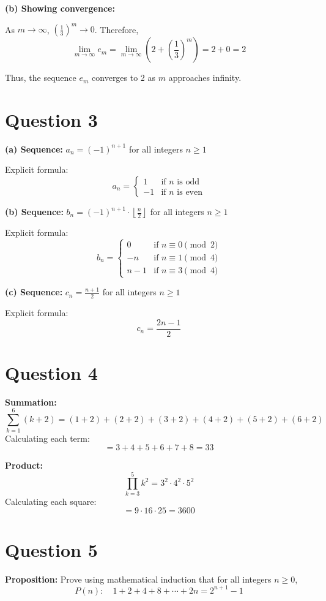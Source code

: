 \documentclass{article}
\begin{document}
\textbf{(b) Showing convergence:}

As $m \to \infty$, $\left(\frac{1}{3}\right)^m \to 0$. Therefore,
\[
\lim_{m \to \infty} e_m = \lim_{m \to \infty} \left(2 + \left(\frac{1}{3}\right)^m\right) = 2 + 0 = 2
\]

Thus, the sequence $e_m$ converges to 2 as $m$ approaches infinity.

\section*{Question 3}

\textbf{(a) Sequence: } $a_n = (-1)^{n+1}$ for all integers $n \geq 1$

Explicit formula:
\[
a_n = \begin{cases}
1 & \text{if } n \text{ is odd} \\
-1 & \text{if } n \text{ is even}
\end{cases}
\]

\textbf{(b) Sequence: } $b_n = (-1)^{n+1} \cdot \left\lfloor \frac{n}{2} \right\rfloor$ for all integers $n \geq 1$

Explicit formula:
\[
b_n = \begin{cases}
0 & \text{if } n \equiv 0 \pmod{2} \\
-n & \text{if } n \equiv 1 \pmod{4} \\
n-1 & \text{if } n \equiv 3 \pmod{4}
\end{cases}
\]

\textbf{(c) Sequence: } $c_n = \frac{n+1}{2}$ for all integers $n \geq 1$

Explicit formula:
\[
c_n = \frac{2n - 1}{2}
\]

\section*{Question 4}

\textbf{Summation: }
\[
\sum_{k=1}^{6} (k+2) = (1+2) + (2+2) + (3+2) + (4+2) + (5+2) + (6+2)
\]
Calculating each term:
\[
= 3 + 4 + 5 + 6 + 7 + 8 = 33
\]

\textbf{Product: }
\[
\prod_{k=3}^{5} k^2 = 3^2 \cdot 4^2 \cdot 5^2
\]
Calculating each square:
\[
= 9 \cdot 16 \cdot 25 = 3600
\]

\section*{Question 5}

\textbf{Proposition:} Prove using mathematical induction that for all integers $n \geq 0$,
\[ P(n): \quad 1 + 2 + 4 + 8 + \cdots + 2n = 2^{n+1} - 1 \]
\end{document}
